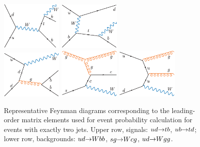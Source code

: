 \begin{figure}[!h!tbp]
\includegraphics[width=0.27\textwidth]{figures/feynman/tb}
\hspace{0.2in}
\includegraphics[width=0.27\textwidth]{figures/feynman/tq}\\
\includegraphics[width=0.27\textwidth]{figures/feynman/wbb}
\hspace{0.2in}
\includegraphics[width=0.27\textwidth]{figures/feynman/wcg}
\hspace{0.2in}
\includegraphics[width=0.27\textwidth]{figures/feynman/wgg}
\caption[2jets]{Representative Feynman diagrams corresponding to 
the leading-order matrix elements used for event probability
calculation for events with exactly two jets. Upper row, signals:
$ud{\rightarrow}tb$, $ub{\rightarrow}td$; lower row, backgrounds: $ud{\rightarrow}Wbb$,
$sg{\rightarrow}Wcg$, $ud{\rightarrow}Wgg$.}
\label{2jets}
\end{figure}

